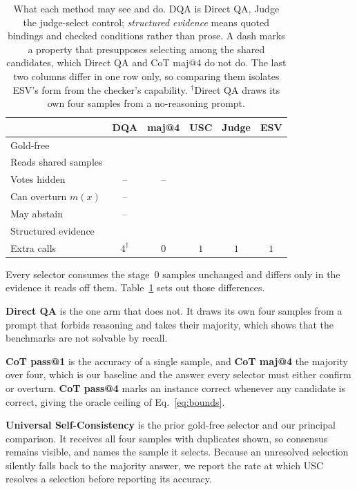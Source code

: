\documentclass[letterpaper]{article} %
\newcommand{\method}{\textsc{ESV}}   %
\newcommand{\yes}{\textcolor{okgreen}{\ding{51}}}
\newcommand{\no}{\textcolor{okred}{\ding{55}}}
\newcommand{\na}{\textcolor{black!45}{--}}
\begin{document}
\begin{table}[t]
\centering
\small
\setlength{\tabcolsep}{4pt}
\begin{tabular}{@{}lccccc@{}}
\toprule
 & DQA & maj@4 & USC & Judge & \textbf{\method{}} \\
\midrule
Gold-free             & \yes & \yes & \yes & \yes & \yes \\
Reads shared samples  & \no  & \yes & \yes & \yes & \yes \\
Votes hidden          & \na  & \na  & \no  & \yes & \yes \\
Can overturn $m(x)$   & \na  & \no  & \yes & \yes & \yes \\
May abstain           & \na  & \no  & \no  & \yes & \yes \\
Structured evidence   & \no  & \no  & \no  & \no  & \yes \\
\midrule
Extra calls           & $4^{\dagger}$ & $0$ & $1$ & $1$ & $1$ \\
\bottomrule
\end{tabular}
\caption{What each method may see and do. DQA is Direct QA, Judge the
judge-select control; \emph{structured evidence} means quoted bindings and
checked conditions rather than prose. A dash marks a property that presupposes
selecting among the shared candidates, which Direct QA and CoT maj@4 do not do.
The last two columns differ in one row only, so comparing them isolates
\method{}'s form from the checker's capability. $^{\dagger}$Direct QA draws its
own four samples from a no-reasoning prompt.}
\label{tab:methods}
\end{table}

Every selector consumes the stage~0 samples unchanged and differs only in the
evidence it reads off them. Table~\ref{tab:methods} sets out those differences.

\noindent\textbf{Direct QA} is the one arm that does not. It draws its own four
samples from a prompt that forbids reasoning and takes their majority, which
shows that the benchmarks are not solvable by recall.

\noindent\textbf{CoT pass@1} is the accuracy of a single sample, and
\textbf{CoT maj@4} \cite{wang2022self} the majority over four, which is our
baseline and the answer every selector must either confirm or overturn. \textbf{CoT
pass@4} marks an instance correct whenever any candidate is correct, giving the
oracle ceiling of Eq.~\eqref{eq:bounds}.

\noindent\textbf{Universal Self-Consistency} \cite{chen2023universal} is the
prior gold-free selector and our principal comparison. It receives all four
samples with duplicates shown, so consensus remains visible, and names the
sample it selects. Because an unresolved selection silently falls back to the
majority answer, we report the rate at which USC resolves a selection before
reporting its accuracy.
\end{document}
